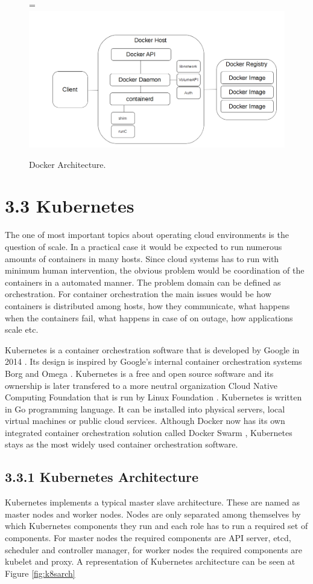 \documentclass[12pt,oneandhalf,chaparabic,ceng,ms,eng,oneside,pntc]{gsufbe}
\makeatletter
\let\old@includegraphics\includegraphics
\renewcommand{\includegraphics}[2][,]{%
  \setbox9=\hbox{\old@includegraphics[#1]{#2}}%
  \ifdim\wd9>\textwidth
    \old@includegraphics[#1,width=\textwidth]{#2}%
  \else
    \old@includegraphics[#1]{#2}%
  \fi%
}
\makeatother
\begin{document}
\begin{figure}
\centering
\includegraphics[]{docker-arch.png}
\caption{Docker Architecture.}
\label{fig:dockerarch}
\end{figure}

\section[Kubernetes]{3.3 Kubernetes}
The one of most important topics about operating cloud environments is the question of scale.  In a
practical case it would be expected to run numerous amounts of containers in many hosts. Since
cloud systems has to run with minimum human intervention, the obvious problem would be coordination
of the containers in a automated manner.  The problem domain can be defined as orchestration.
For container orchestration the main issues would be how containers is distributed among hosts,
how they communicate, what happens when the containers fail, what happens in case of on outage,
how applications scale etc.

Kubernetes is a container orchestration software that is developed by Google in 2014 \cite{Kubernetes}.
Its design is
inspired by Google's internal container orchestration systems Borg and Omega \cite{burns_borg_2016}.
Kubernetes is a free and open source software and its ownership is later transfered to a more neutral
organization Cloud Native Computing Foundation \cite{cncf} that is run by Linux Foundation
\cite{linux_foundation}.  Kubernetes is written in Go programming language.
It can be installed into physical servers, local virtual machines or public cloud services.  Although
Docker now has its own integrated container orchestration solution called Docker Swarm 
\cite{docker_swarm}, Kubernetes stays as the most widely used container orchestration software.

\subsection[Kubernetes Architecture]{3.3.1 Kubernetes Architecture}
Kubernetes implements a typical master slave architecture.  These are named as master nodes and worker
nodes.  Nodes are only separated among themselves by which Kubernetes components they run and each role 
has to run a required set of components.  For master nodes the required components are API server, etcd,
scheduler and
controller manager, for worker nodes the required components are kubelet and proxy.  A representation
of Kubernetes architecture can be seen at Figure \ref{fig:k8sarch}
\end{document}
